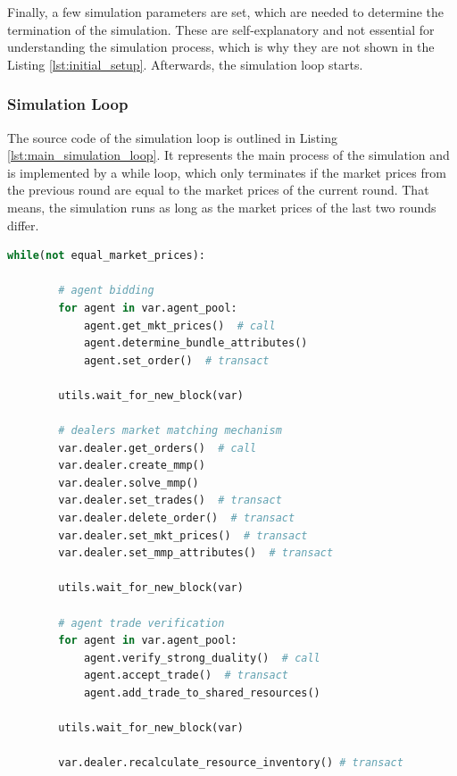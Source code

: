 Finally, a few simulation parameters are set, which are needed to determine the termination of the simulation.
These are self-explanatory and not essential for understanding the simulation process, which is why they are not shown in the Listing \ref{lst:initial_setup}.
Afterwards, the simulation loop starts.

\subsubsection{Simulation Loop}
The source code of the simulation loop is outlined in Listing \ref{lst:main_simulation_loop}.
It represents the main process of the simulation and is implemented
by a while loop, which only terminates if the 
market prices from the previous round are equal to the market prices of the current round.
That means, the simulation runs as long as the market prices of the last two rounds differ.

\begin{lstlisting}[float=htbp, label=lst:main_simulation_loop, caption=Main Simulation Loop, language=Python]
    while(not equal_market_prices):
        
        # agent bidding
        for agent in var.agent_pool:
            agent.get_mkt_prices()  # call
            agent.determine_bundle_attributes()
            agent.set_order()  # transact

        utils.wait_for_new_block(var)

        # dealers market matching mechanism
        var.dealer.get_orders()  # call
        var.dealer.create_mmp()
        var.dealer.solve_mmp()
        var.dealer.set_trades()  # transact
        var.dealer.delete_order()  # transact
        var.dealer.set_mkt_prices()  # transact
        var.dealer.set_mmp_attributes()  # transact

        utils.wait_for_new_block(var)

        # agent trade verification
        for agent in var.agent_pool:
            agent.verify_strong_duality()  # call
            agent.accept_trade()  # transact
            agent.add_trade_to_shared_resources()

        utils.wait_for_new_block(var)

        var.dealer.recalculate_resource_inventory() # transact        
\end{lstlisting}

